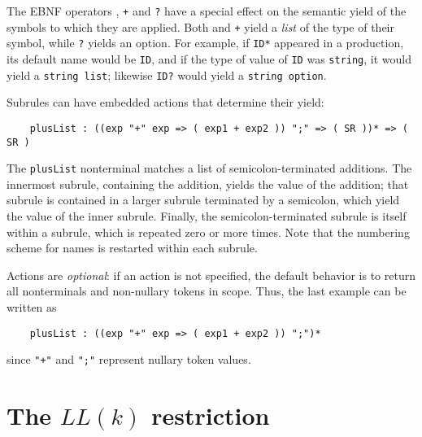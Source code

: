 The EBNF operators {\tt *}, {\tt +} and {\tt ?} have a special effect on the semantic yield of the symbols to which they are applied.  Both {\tt *} and {\tt +} yield a \emph{list} of the type of their symbol, while {\tt ?} yields an option.  For example, if {\tt ID*} appeared in a production, its default name would be {\tt ID}, and if the type of value of {\tt ID} was {\tt string}, it would yield a {\tt string list}; likewise {\tt ID?} would yield a {\tt string option}.  

Subrules can have embedded actions that determine their yield:
\begin{verbatim}
    plusList : ((exp "+" exp => ( exp1 + exp2 )) ";" => ( SR ))* => ( SR )
\end{verbatim}
The {\tt plusList} nonterminal matches a list of semicolon-terminated additions.  The innermost subrule, containing the addition, yields the value of the addition; that subrule is contained in a larger subrule terminated by a semicolon, which yield the value of the inner subrule.  Finally, the semicolon-terminated subrule is itself within a subrule, which is repeated zero or more times.  Note that the numbering scheme for names is restarted within each subrule.

Actions are \emph{optional}: if an action is not specified, the default behavior is to return all nonterminals and non-nullary tokens in scope.  Thus, the last example can be written as 
\begin{verbatim}
    plusList : ((exp "+" exp => ( exp1 + exp2 )) ";")*
\end{verbatim}
since {\tt "+"} and {\tt ";"} represent nullary token values.

\section{The $LL(k)$ restriction}\label{sec:antlr-llk}

